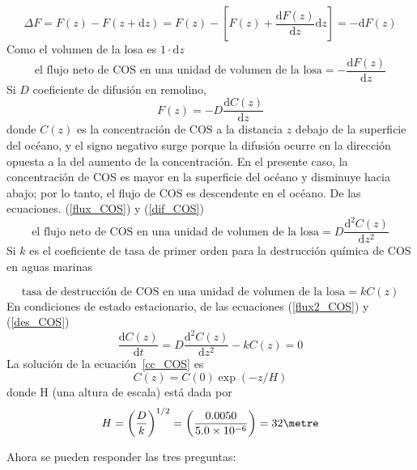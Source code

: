\begin{example}
\begin{equation}
\Delta F=F(z)-F(z+\mathrm{d}z)=F(z)-\left[ F(z)+\frac{\mathrm{d}F(z)}{\mathrm{d}z}\mathrm{d}z \right]=-\mathrm{d}F(z)
\end{equation}
Como el volumen de la losa es $1\cdot \mathrm{d}z$ 
\begin{equation}
\textrm{el flujo neto de COS en una unidad de volumen de la losa} =-\frac{\mathrm{d}F(z)}{\mathrm{d}z}
\label{flux_COS}
\end{equation}
Si $D$ coeficiente de difusión en remolino,
\begin{equation}
F(z)=-D\frac{\mathrm{d}C(z)}{\mathrm{d}z}
\label{dif_COS}
\end{equation}
donde $C(z)$ es la concentración de COS a la distancia $z$ debajo de la superficie del océano, y el signo negativo surge porque la difusión ocurre en la dirección opuesta a la del aumento de la concentración. En el presente caso, la concentración de COS es mayor en la superficie del océano y disminuye hacia abajo; por lo tanto, el flujo de COS es descendente en el océano. De las ecuaciones. (\ref{flux_COS}) y (\ref{dif_COS})
\begin{equation}
\textrm{el flujo neto de COS en una unidad de volumen de la losa} =D\frac{\mathrm{d}^2C(z)}{\mathrm{d}z^2}
\label{flux2_COS}
\end{equation}
\noindent Si $k$ es el coeficiente de tasa de primer orden para la destrucción química de COS en aguas marinas 

\begin{equation}
\textrm{tasa de destrucción de COS en una unidad de volumen de la losa} =kC(z)
\label{des_COS}
\end{equation}
\noindent En condiciones de estado estacionario, de las ecuaciones (\ref{flux2_COS}) y  (\ref{des_COS})
\begin{equation}
\frac{\mathrm{d}C(z)}{\mathrm{d}t}=D\frac{\mathrm{d}^2C(z)}{\mathrm{d}z^2}-kC(z)=0
\label{cc_COS}
\end{equation}
La solución de la ecuación~\ref{cc_COS} es
\begin{equation}
C(z)=C(0)\exp(-z/H)
\label{c_cos}
\end{equation}
\noindent donde H (una altura de escala) está dada por
\begin{equation}
H=\left( \frac{D}{k}\right)^{1/2} =  \left( \frac{0.0050}{5.0\times10^{-6}}\right)=32 \metre
\label{H_COS}
\end{equation}

Ahora se pueden responder las tres preguntas:


\end{example}
